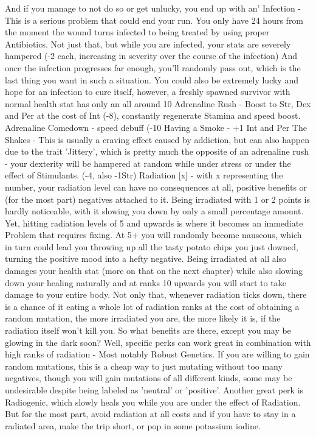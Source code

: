 \documentclass[11pt]{report}
\begin{document}
And if you manage to not do so or get unlucky, you end up with an'
Infection - This is a serious problem that could end your run. You only have 24 hours from the moment the wound turns infected to being treated by using proper Antibiotics. Not just that, but while you are infected, your stats are severely hampered (-2 each, increasing in severity over the course of the infection) And once the infection progresses far enough, you'll randomly pass out, which is the last thing you want in such a situation.
You could also be extremely lucky and hope for an infection to cure itself, however, a freshly spawned survivor with normal health stat has only an all around 10%
Adrenaline Rush - Boost to Str, Dex and Per at the cost of Int (-8), constantly regenerate Stamina and speed boost.
Adrenaline Comedown - speed debuff (-10%
Having a Smoke - +1 Int and Per
The Shakes - This is usually a craving effect caused by addiction, but can also happen due to the trait 'Jittery', which is pretty much the opposite of an adrenaline rush - your dexterity will be hampered at random while under stress or under the effect of Stimulants. (-4, also -1Str)
Radiation [x] - with x representing the number, your radiation level can have no consequences at all, positive benefits or (for the most part) negatives attached to it. Being irradiated with 1 or 2 points is hardly noticeable, with it slowing you down by only a small percentage amount. Yet, hitting radiation levels of 5 and upwards is where it becomes an immediate Problem that requires fixing. At 5+ you will randomly become nauseous, which in turn could lead you throwing up all the tasty potato chips you just downed, turning the positive mood into a hefty negative. Being irradiated at all also damages your health stat (more on that on the next chapter) while also slowing down your healing naturally and at ranks 10 upwards you will start to take damage to your entire body. Not only that, whenever radiation ticks down, there is a chance of it eating a whole lot of radiation ranks at the cost of obtaining a random mutation, the more irradiated you are, the more likely it is, if the radiation itself won't kill you. So what benefits are there, except you may be glowing in the dark soon? Well, specific perks can work great in combination with high ranks of radiation - Most notably Robust Genetics. If you are willing to gain random mutations, this is a cheap way to just mutating without too many negatives, though you will gain mutations of all different kinds, some may be undesirable despite being labeled as 'neutral' or 'positive'. Another great perk is Radiogenic, which slowly heals you while you are under the effect of Radiation. But for the most part, avoid radiation at all costs and if you have to stay in a radiated area, make the trip short, or pop in some potassium iodine.
\end{document}
